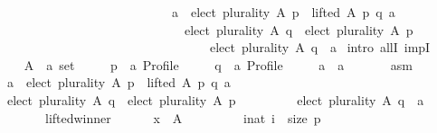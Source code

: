 \begin{isabellebody}
\ \ \ \ \ \ \ \ \ \ \ \ \ \ \ \ \ \ \ \ \ \ \ \ \ \ \ \ \ \ {\isacharparenleft}{\kern0pt}a\ {\isasymin}\ elect\ plurality\ A\ p\ {\isasymand}\ lifted\ A\ p\ q\ a{\isacharparenright}{\kern0pt}\ {\isasymlongrightarrow}\isanewline
\ \ \ \ \ \ \ \ \ \ \ \ \ \ \ \ \ \ \ \ \ \ \ \ \ \ \ \ \ \ \ \ {\isacharparenleft}{\kern0pt}elect\ plurality\ A\ q\ {\isacharequal}{\kern0pt}\ elect\ plurality\ A\ p\ {\isasymor}\isanewline
\ \ \ \ \ \ \ \ \ \ \ \ \ \ \ \ \ \ \ \ \ \ \ \ \ \ \ \ \ \ \ \ \ \ \ \ elect\ plurality\ A\ q\ {\isacharequal}{\kern0pt}\ {\isacharbraceleft}{\kern0pt}a{\isacharbraceright}{\kern0pt}{\isacharparenright}{\kern0pt}{\isachardoublequoteclose}\isanewline
%
\isadelimproof
%
\endisadelimproof
%
\isatagproof
{}\isamarkupfalse%
\ {\isacharparenleft}{\kern0pt}intro\ allI\ impI{\isacharparenright}{\kern0pt}\isanewline
\ \ \isamarkupfalse%
\isanewline
\ \ \ \ A\ {\isacharcolon}{\kern0pt}{\isacharcolon}{\kern0pt}\ {\isachardoublequoteopen}{\isacharprime}{\kern0pt}a\ set{\isachardoublequoteclose}\ \isanewline
\ \ \ \ p\ {\isacharcolon}{\kern0pt}{\isacharcolon}{\kern0pt}\ {\isachardoublequoteopen}{\isacharprime}{\kern0pt}a\ Profile{\isachardoublequoteclose}\ \isanewline
\ \ \ \ q\ {\isacharcolon}{\kern0pt}{\isacharcolon}{\kern0pt}\ {\isachardoublequoteopen}{\isacharprime}{\kern0pt}a\ Profile{\isachardoublequoteclose}\ \isanewline
\ \ \ \ a\ {\isacharcolon}{\kern0pt}{\isacharcolon}{\kern0pt}\ {\isachardoublequoteopen}{\isacharprime}{\kern0pt}a{\isachardoublequoteclose}\isanewline
\ \ \isamarkupfalse%
\isanewline
\ \ \ \ asm{}{\isacharcolon}{\kern0pt}\isanewline
\ \ \ \ {\isachardoublequoteopen}a\ {\isasymin}\ elect\ plurality\ A\ p\ {\isasymand}\ lifted\ A\ p\ q\ a{\isachardoublequoteclose}\isanewline
\ \ \isamarkupfalse%
\isanewline
\ \ \ \ {\isachardoublequoteopen}elect\ plurality\ A\ q\ {\isacharequal}{\kern0pt}\ elect\ plurality\ A\ p\ {\isasymor}\isanewline
\ \ \ \ \ \ \ \ elect\ plurality\ A\ q\ {\isacharequal}{\kern0pt}\ {\isacharbraceleft}{\kern0pt}a{\isacharbraceright}{\kern0pt}{\isachardoublequoteclose}\isanewline
\ \ \isamarkupfalse%
\ {\isacharminus}{\kern0pt}\isanewline
\ \ \ \ \isamarkupfalse%
\ lifted{\isacharunderscore}{\kern0pt}winner{\isacharcolon}{\kern0pt}\isanewline
\ \ \ \ \ \ {\isachardoublequoteopen}{\isasymforall}x\ {\isasymin}\ A{\isachardot}{\kern0pt}\isanewline
\ \ \ \ \ \ \ \ \ {\isasymforall}i{\isacharcolon}{\kern0pt}{\isacharcolon}{\kern0pt}nat{\isachardot}{\kern0pt}\ i\ {\isacharless}{\kern0pt}\ size\ p\ {\isasymlongrightarrow}\isanewline

\end{isabellebody}

